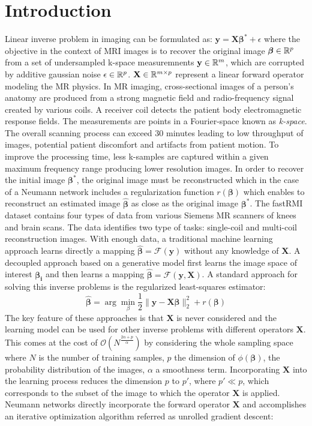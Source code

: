 \documentclass[12pt,twoside]{article}
\begin{document}
\section*{Introduction}
Linear inverse problem in imaging can be formulated as: $\textbf{y} = \mathbf{X} \bm{\beta^*} + \epsilon$ where the objective in the context of MRI images is to recover the original image
$\bm{\beta} \in \mathbb{R}^p$ from a set of undersampled k-space measuremnents  $\textbf{y} \in \mathbb{R}^m$,  which are corrupted by additive gaussian noise $\epsilon \in \mathbb{R}^p$.
$ \mathbf{X} \in \mathbb{R}^{m \times p}$ represent a linear forward operator modeling the MR physics. In MR imaging, cross-sectional images of a person's anatomy are produced
from a strong magnetic field and radio-frequency signal created by various coils. A receiver coil detects the patient body electromagnetic response fields. The measurements are points in
a Fourier-space known as  \emph{k-space}. The overall scanning process can exceed $30$ minutes leading to low throughput of images, potential patient discomfort and artifacts
from patient motion. To improve the processing time, less k-samples are captured within a given maximum frequency range producing lower resolution images. In order to recover the initial
image $\bm{\beta^*}$, the original image must be reconstructed which in the case of a Neumann network includes a regularization  function $r(\bm{\beta})$ which enables to reconstruct an estimated image $\hat{\bm{\beta}}$ 
as close as the original image $\bm{\beta^*}$. The fastRMI dataset contains four types of data from various Siemens MR scanners of knees and brain scans. The data identifies two type of tasks:
 single-coil  and multi-coil reconstruction images. With enough data, a traditional machine learning approach learns directly a mapping $\bm{\hat{\beta}} = \mathcal{F}(\textbf{y})$ without any knowledge of $\mathbf{X}$.
 A decoupled approach based on a generative model first learns the image space of interest $\bm{\beta_i}$ and then learns a mapping $\bm{\hat{\beta}} = \mathcal{F}(\textbf{y}, \mathbf{X})$.
 A standard approach for solving this inverse problems is the regularized least-squares estimator:
 $$ \bm{\hat{\beta}} = \arg \min_{\beta} \frac{1}{2} \| \textbf{y} - \mathbf{X} \bm{\beta} \|_2^2 + r(\bm{\beta})$$
 The key feature of these approaches is that $ \mathbf{X}$ is never considered and the learning model can be used for other inverse problems with different operators $\mathbf{X}$.
 This comes at the cost of $\mathcal{O}(N^{ \frac{2 \alpha + p} {\alpha} })$ by considering the whole sampling space
  where $N$ is the number of training samples, $p$ the dimension of $\phi(\bm{\beta})$, the probability distribution of the images, $\alpha$ a smoothness term.
  Incorporating $\mathbf{X}$ into the learning process reduces the dimension $p$ to $p'$, where $p' \ll p$, which corresponds to the subset of the image to which the operator $\mathbf{X}$ is applied.
  Neumann networks directly incorporate the forward operator $\mathbf{X}$ and accomplishes an iterative optimization algorithm referred as unrolled gradient descent:
  
\end{document}
